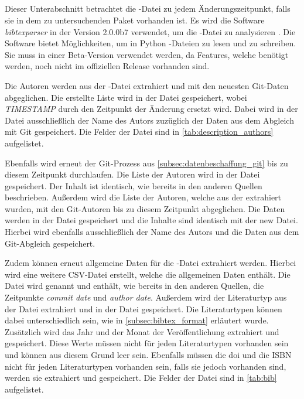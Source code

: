 \subsection{}
\label{subsec:datenbeschaffung_bibtex}
Dieser Unterabschnitt betrachtet die -Datei zu jedem Änderungszeitpunkt, falls sie in dem zu untersuchenden Paket vorhanden ist.
Es wird die Software \emph{bibtexparser} in der Version 2.0.0b7 verwendet, um die -Datei zu analysieren \autocite{weiss_python-bibtexparser_2024}.
Die Software bietet Möglichkeiten, um in Python -Dateien zu lesen und zu schreiben.
Sie muss in einer Beta-Version verwendet werden, da Features, welche benötigt werden, noch nicht im offiziellen Release vorhanden sind.

Die Autoren werden aus der -Datei extrahiert und mit den neuesten Git-Daten abgeglichen.
Die erstellte Liste wird in der Datei  gespeichert, wobei \emph{TIMESTAMP} durch den Zeitpunkt der Änderung ersetzt wird.
Dabei wird in der Datei ausschließlich der Name des Autors zuzüglich der Daten aus dem Abgleich mit Git gespeichert.
Die Felder der Datei sind in \autoref{tab:description_authors} aufgelistet.

Ebenfalls wird erneut der Git-Prozess aus \autoref{subsec:datenbeschaffung_git} bis zu diesem Zeitpunkt durchlaufen.
Die Liste der Autoren wird in der Datei  gespeichert.
Der Inhalt ist identisch, wie bereits in den anderen Quellen beschrieben.
Außerdem wird die Liste der Autoren, welche aus der  extrahiert wurden, mit den Git-Autoren bis zu diesem Zeitpunkt abgeglichen.
Die Daten werden in der Datei  gespeichert und die Inhalte sind identisch mit der \glqq new\grqq{} Datei.
Hierbei wird ebenfalls ausschließlich der Name des Autors und die Daten aus dem Git-Abgleich gespeichert.

Zudem können erneut allgemeine Daten für die -Datei extrahiert werden.
Hierbei wird eine weitere CSV-Datei erstellt, welche die allgemeinen Daten enthält.
Die Datei wird  genannt und enthält, wie bereits in den anderen Quellen, die Zeitpunkte \emph{commit date} und \emph{author date}.
Außerdem wird der Literaturtyp aus der Datei extrahiert und in der Datei gespeichert.
Die Literaturtypen können dabei unterschiedlich sein, wie in \autoref{subsec:bibtex_format} erläutert wurde.
Zusätzlich wird das Jahr und der Monat der Veröffentlichung extrahiert und gespeichert.
Diese Werte müssen nicht für jeden Literaturtypen vorhanden sein und können aus diesem Grund leer sein.
Ebenfalls müssen die \gls{doi} und die ISBN nicht für jeden Literaturtypen vorhanden sein, falls sie jedoch vorhanden sind, werden sie extrahiert und gespeichert.
Die Felder der Datei sind in \autoref{tab:bib} aufgelistet.

